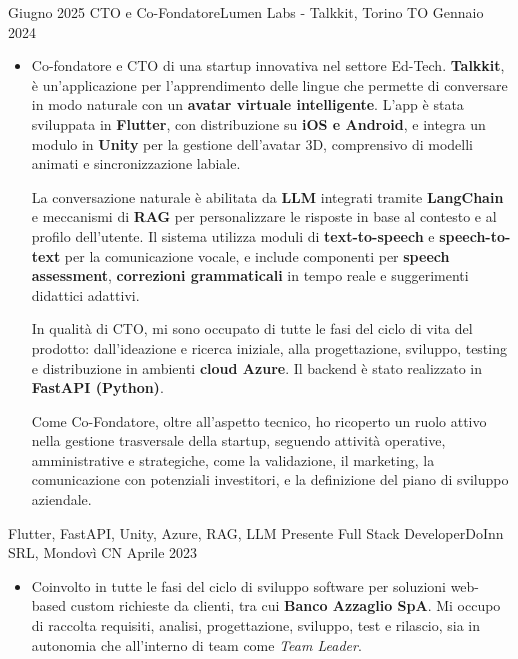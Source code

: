\begin{experiences}

        \experience
{Giugno 2025}   {CTO e Co-Fondatore}{Lumen Labs - Talkkit, Torino TO}
{Gennaio 2024} {
	\begin{itemize}
	\item Co-fondatore e CTO di una startup innovativa nel settore Ed-Tech. \textbf{Talkkit}, è un'applicazione per l'apprendimento delle lingue che permette di conversare in modo naturale con un \textbf{avatar virtuale intelligente}. L'app è stata sviluppata in \textbf{Flutter}, con distribuzione su \textbf{iOS e Android}, e integra un modulo in \textbf{Unity} per la gestione dell’avatar 3D, comprensivo di modelli animati e sincronizzazione labiale.

La conversazione naturale è abilitata da \textbf{LLM} integrati tramite \textbf{LangChain} e meccanismi di \textbf{RAG} per personalizzare le risposte in base al contesto e al profilo dell’utente. Il sistema utilizza moduli di \textbf{text-to-speech} e \textbf{speech-to-text} per la comunicazione vocale, e include componenti per \textbf{speech assessment}, \textbf{correzioni grammaticali} in tempo reale e suggerimenti didattici adattivi.


	In qualità di CTO, mi sono occupato di tutte le fasi del ciclo di vita del prodotto: dall'ideazione e ricerca iniziale, alla progettazione, sviluppo, testing e distribuzione in ambienti \textbf{cloud Azure}. Il backend è stato realizzato in \textbf{FastAPI (Python)}.

	Come Co-Fondatore, oltre all’aspetto tecnico, ho ricoperto un ruolo attivo nella gestione trasversale della startup, seguendo attività operative, amministrative e strategiche, come la validazione, il marketing, la comunicazione con potenziali investitori, e la definizione del piano di sviluppo aziendale.
\end{itemize}

}
{Flutter, FastAPI, Unity, Azure, RAG, LLM}
\emptySeparator
\emptySeparator
\experience
{Presente}   {Full Stack Developer}{DoInn SRL, Mondovì CN}
{Aprile 2023} {
	\begin{itemize}
		\item Coinvolto in tutte le fasi del ciclo di sviluppo software per soluzioni web-based custom richieste da clienti, tra cui \textbf{Banco Azzaglio SpA}. Mi occupo di raccolta requisiti, analisi, progettazione, sviluppo, test e rilascio, sia in autonomia che all'interno di team come \textit{Team Leader}.
		

\end{itemize}}
\end{experiences}
